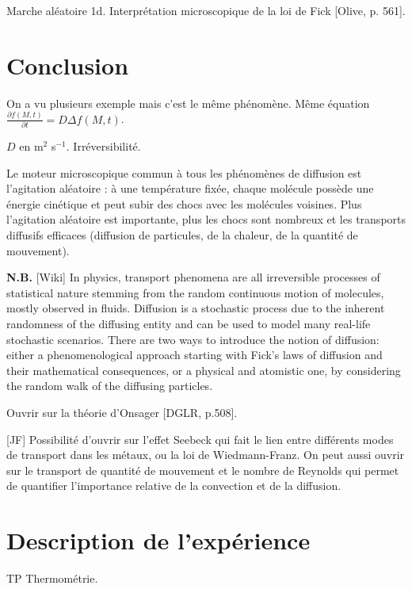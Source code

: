 \documentclass[11pt]{report}
\numberwithin{figure}{section}
\numberwithin{equation}{section}
\numberwithin{table}{section}
\newcommand{\1}{\boldsymbol{1}}
\begin{document}
Marche aléatoire 1d. Interprétation microscopique de la loi de Fick [Olive, p. 561].



\section*{Conclusion}

On a vu plusieurs exemple mais c'est le même phénomène. Même équation $\frac{\partial f(M,t)}{\partial t} = D \Delta f(M,t)$. 

$D$ en m$^2$ s$^{-1}$. Irréversibilité.

Le moteur microscopique commun à tous les phénomènes de diffusion est l'agitation
aléatoire : à une température fixée, chaque molécule possède une énergie cinétique et peut subir des chocs avec les molécules voisines. Plus l'agitation aléatoire est importante, plus les chocs sont nombreux et les transports diffusifs efficaces (diffusion de particules, de la chaleur, de la quantité de mouvement).

\textbf{N.B.} [Wiki] In physics, transport phenomena are all irreversible processes of statistical nature stemming from the random continuous motion of molecules, mostly observed in fluids. Diffusion is a stochastic process due to the inherent randomness of the diffusing entity and can be used to model many real-life stochastic scenarios. There are two ways to introduce the notion of diffusion: either a phenomenological approach starting with Fick's laws of diffusion and their mathematical consequences, or a physical and atomistic one, by considering the random walk of the diffusing particles.

Ouvrir sur la théorie d'Onsager [DGLR, p.508].


[JF] Possibilité d’ouvrir sur l’effet Seebeck qui fait le lien entre différents modes de transport dans les
métaux, ou la loi de Wiedmann-Franz. On peut aussi ouvrir sur le transport de quantité de mouvement et le nombre
de Reynolds qui permet de quantifier l’importance relative de la convection et de la diffusion.


\section*{Description de l'expérience}

TP Thermométrie.
\end{document}
